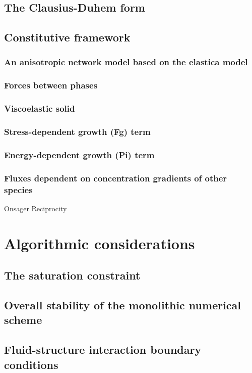 \subsection{The Clausius-Duhem form}
\subsection{Constitutive framework}
\subsubsection{An anisotropic network model based on the elastica
  model}
\subsubsection{Forces between phases}
\subsubsection{Viscoelastic solid}
\subsubsection{Stress-dependent growth (Fg) term}
\subsubsection{Energy-dependent growth (Pi) term}
\subsubsection{Fluxes dependent on concentration gradients of other
  species}
Onsager Reciprocity
\section{Algorithmic considerations}
\subsection{The saturation constraint}
\subsection{Overall stability of the monolithic numerical scheme}
\subsection{Fluid-structure interaction boundary conditions}


%

